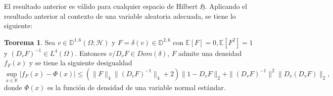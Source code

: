 \documentclass[letterpaper,twoside]{book}
\newcommand{\R}{\mathbb{R}}
\newcommand{\D}{\mathbb{D}}
\newcommand{\E}{\mathbb{E}}
\newcommand{\1}{\mathds{1}}
\newcommand{\abs}[1]{\left\lvert #1 \right\rvert}
\theoremstyle{definition}
\theoremstyle{definition}
\newtheorem{teo}{Teorema}
\theoremstyle{definition}
\theoremstyle{definition}
\theoremstyle{definition}
\theoremstyle{definition}
\theoremstyle{definition}
\begin{document}
 El resultado anterior es válido para cualquier espacio de Hilbert $\mathfrak{H}$. Aplicando el resultado anterior al contexto de una variable aleatoria adecuada, se tiene lo siguiente:

 \begin{teo} 
  Sea $v\in \D^{1,6}(\Omega;\mathcal{H})$ y $F=\delta(v)\in \D^{2,6}$ con $\E\left[F\right]=0, \E\left[F^{2}\right]=1$ y $\left(D_vF\right)^{-1}\in L^4(\Omega)$. Entonces $v/D_vF \in Dom(\delta)$, $F$ admite una densidad $f_F(x)$ y se tiene la siguiente desigualdad
  \[
    \sup_{x\in \R} \abs{f_F(x)-\Phi(x)}\leq \left(\|F\|_4\|\left(D_vF\right)^{-1}\|_4+2\right)\|1-D_vF\|_2+\|\left(D_vF\right)^{-1}\|^{2}\|D_v \left(D_vF\right)\|_2,
    \]
donde $\Phi(x)$ es la función de densidad de una variable normal estándar.

\end{teo}
\end{document}
